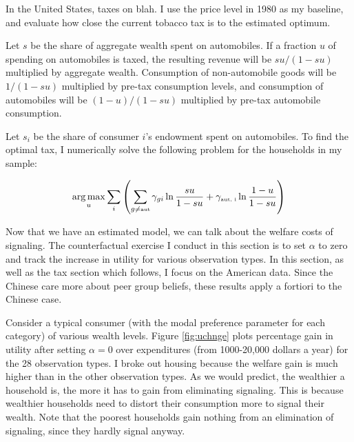 \documentclass[12pt]{article}
\begin{document}
In the United States, taxes on blah.  I use the price level in 1980 as my baseline, and evaluate how close the current tobacco tax is to the estimated optimum.

Let $s$ be the share of aggregate wealth spent on automobiles.  If a fraction $u$ of spending on automobiles is taxed, the resulting revenue will be $su / (1 - su)$ multiplied by aggregate wealth.  Consumption of non-automobile goods will be $1 / (1-su)$ multiplied by pre-tax consumption levels, and consumption of automobiles will be $(1 - u) / (1 - su)$ multiplied by pre-tax automobile consumption.

Let $s_i$ be the share of consumer $i$'s endowment spent on automobiles.  To find the optimal tax, I numerically solve the following problem for the households in my sample:

\begin{equation}
    \underset{u}{\arg \max} \sum_i \left(\sum_{g \neq \mbox{\tiny{aut}}} \gamma_{gi} \ln \frac{s u}{1-s u} + \gamma_{\mbox{\tiny{aut, i}}} \ln \frac{1-u}{1 - s u}\right)
\end{equation}













Now that we have an estimated model, we can talk about the welfare costs of signaling.
The counterfactual exercise I conduct in this section is to set $\alpha$ to zero and track the increase in utility for various observation types.
In this section, as well as the tax section which follows, I focus on the American data.  Since the Chinese care more about peer group beliefs, these results apply a fortiori to the Chinese case.

Consider a typical consumer (with the modal preference parameter for each category) of various wealth levels.  
Figure \ref{fig:uchnge} plots percentage gain in utility after setting $\alpha = 0$ over expenditures (from 1000-20,000 dollars a year) for the 28  observation types.
I broke out housing because the welfare gain is much higher than in the other observation types.
As we would  predict, the wealthier a household is, the more it has to gain from eliminating signaling.
This is because wealthier households need to distort their consumption more to signal their wealth. 
Note that the poorest households gain nothing from an elimination of signaling, since they hardly signal anyway.
\end{document}
